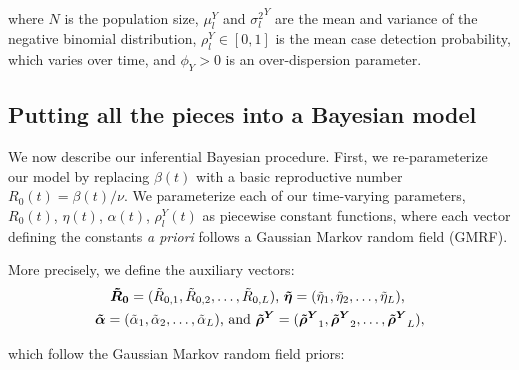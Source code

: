 where $N$ is the population size, $ \mu^Y_l $ and $ {\sigma^2_l}^Y $ are the mean and variance of the negative binomial distribution, $ \rho_l^Y \in [0,1]$ is the mean case detection probability, which varies over time, and $ \phi_Y > 0 $ is an over-dispersion parameter.

\subsection{Putting all the pieces into a Bayesian model}
\label{ch_4:subsec:limitations}
We now describe our inferential Bayesian procedure.
First, we re-parameterize our model by replacing $\beta(t)$ with a basic reproductive number $R_0(t) = \beta(t) / \nu$.
We parameterize each of our time-varying parameters, $R_0(t)$, $\eta(t)$, $\alpha(t)$, $\rho_l^Y(t)$ as piecewise constant functions, where each vector defining the constants \textit{a priori} follows a Gaussian Markov random field (GMRF).

More precisely, we define the auxiliary vectors:
\begin{gather*}
\boldsymbol{\tilde{R}_0} = (\tilde{R}_{0,1}, \tilde{R}_{0,2}, \ldots, \tilde{R}_{0,L}) \text{, } \boldsymbol{\tilde{\eta}} = (\tilde{\eta}_1, \tilde{\eta}_2, \ldots, \tilde{\eta}_L) \text{, }\\
\boldsymbol{\tilde{\alpha}} = (\tilde{\alpha}_1, \tilde{\alpha}_2, \ldots, \tilde{\alpha}_L)  \text{, and }
\boldsymbol{\tilde{\rho}^Y} = (\boldsymbol{\tilde{\rho}^Y}_1, \boldsymbol{\tilde{\rho}^Y}_2, \ldots, \boldsymbol{\tilde{\rho}^Y}_L),
\end{gather*}

which follow the Gaussian Markov random field priors:

